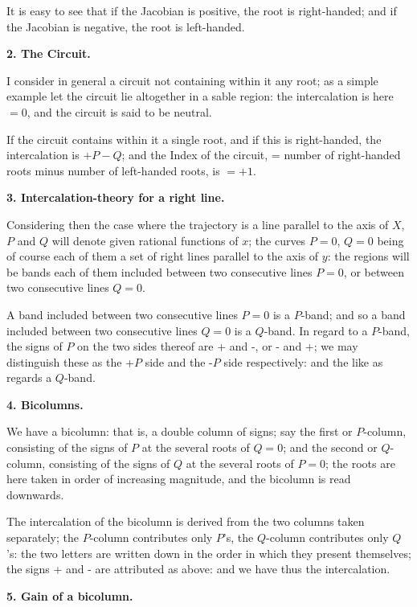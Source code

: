 \documentclass[12pt,a4paper]{article}
\theoremstyle{plain}
\theoremstyle{definition}
\begin{document}
It is easy to see that if the Jacobian is positive, the root is right-handed; and if the Jacobian is negative, the root is left-handed.

\textbf{2. The Circuit.}

I consider in general a circuit not containing within it any root; as a simple example let the circuit lie altogether in a sable region: the intercalation is here $= 0$, and the circuit is said to be neutral.

If the circuit contains within it a single root, and if this is right-handed, the intercalation is $+P - Q$; and the Index of the circuit, = number of right-handed roots minus number of left-handed roots, is $= +1$.

\newpage
\setcounter{page}{22}

\textbf{3. Intercalation-theory for a right line.}

Considering then the case where the trajectory is a line parallel to the axis of $X$, $P$ and $Q$ will denote given rational functions of $x$; the curves $P = 0$, $Q = 0$ being of course each of them a set of right lines parallel to the axis of $y$: the regions will be bands each of them included between two consecutive lines $P = 0$, or between two consecutive lines $Q = 0$.

A band included between two consecutive lines $P = 0$ is a $P$-band; and so a band included between two consecutive lines $Q = 0$ is a $Q$-band. In regard to a $P$-band, the signs of $P$ on the two sides thereof are + and -, or - and +; we may distinguish these as the +$P$ side and the -$P$ side respectively: and the like as regards a $Q$-band.

\textbf{4. Bicolumns.}

We have a bicolumn: that is, a double column of signs; say the first or $P$-column, consisting of the signs of $P$ at the several roots of $Q = 0$; and the second or $Q$-column, consisting of the signs of $Q$ at the several roots of $P = 0$; the roots are here taken in order of increasing magnitude, and the bicolumn is read downwards.

The intercalation of the bicolumn is derived from the two columns taken separately; the $P$-column contributes only $P$'s, the $Q$-column contributes only $Q$'s: the two letters are written down in the order in which they present themselves; the signs + and - are attributed as above: and we have thus the intercalation.

\newpage
\setcounter{page}{23}

\textbf{5. Gain of a bicolumn.}
\end{document}
